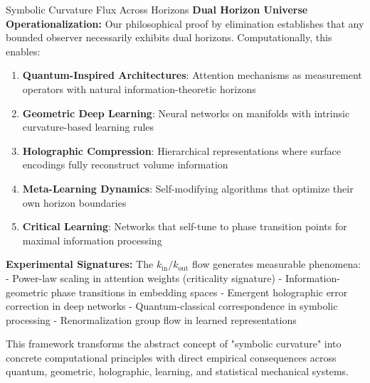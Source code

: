 \begin{scholium}{Symbolic Curvature Flux Across Horizons}
\textbf{Dual Horizon Universe Operationalization:}
Our philosophical proof by elimination establishes that any bounded observer necessarily exhibits dual horizons. Computationally, this enables:

\begin{enumerate}
\item \textbf{Quantum-Inspired Architectures}: Attention mechanisms as measurement operators with natural information-theoretic horizons
\item \textbf{Geometric Deep Learning}: Neural networks on manifolds with intrinsic curvature-based learning rules
\item \textbf{Holographic Compression}: Hierarchical representations where surface encodings fully reconstruct volume information
\item \textbf{Meta-Learning Dynamics}: Self-modifying algorithms that optimize their own horizon boundaries
\item \textbf{Critical Learning}: Networks that self-tune to phase transition points for maximal information processing
\end{enumerate}

\textbf{Experimental Signatures:}
The $k_{\text{in}}/k_{\text{out}}$ flow generates measurable phenomena:
- Power-law scaling in attention weights (criticality signature)
- Information-geometric phase transitions in embedding spaces  
- Emergent holographic error correction in deep networks
- Quantum-classical correspondence in symbolic processing
- Renormalization group flow in learned representations

This framework transforms the abstract concept of "symbolic curvature" into concrete computational principles with direct empirical consequences across quantum, geometric, holographic, learning, and statistical mechanical systems.
\end{scholium}

